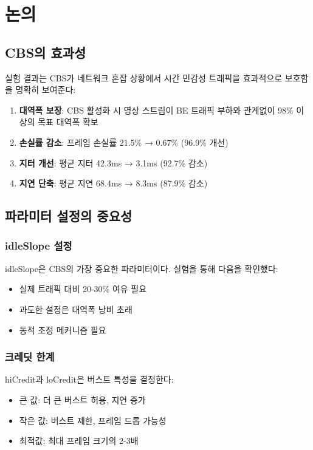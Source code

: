\documentclass[10pt,twocolumn]{IEEEtran}
\begin{document}
\section{논의}

\subsection{CBS의 효과성}

실험 결과는 CBS가 네트워크 혼잡 상황에서 시간 민감성 트래픽을 효과적으로 보호함을 명확히 보여준다:

\begin{enumerate}
\item \textbf{대역폭 보장}: CBS 활성화 시 영상 스트림이 BE 트래픽 부하와 관계없이 98\% 이상의 목표 대역폭 확보
\item \textbf{손실률 감소}: 프레임 손실률 21.5\% → 0.67\% (96.9\% 개선)
\item \textbf{지터 개선}: 평균 지터 42.3ms → 3.1ms (92.7\% 감소)
\item \textbf{지연 단축}: 평균 지연 68.4ms → 8.3ms (87.9\% 감소)
\end{enumerate}

\subsection{파라미터 설정의 중요성}

\subsubsection{idleSlope 설정}
idleSlope은 CBS의 가장 중요한 파라미터이다. 실험을 통해 다음을 확인했다:
\begin{itemize}
\item 실제 트래픽 대비 20-30\% 여유 필요
\item 과도한 설정은 대역폭 낭비 초래
\item 동적 조정 메커니즘 필요
\end{itemize}

\subsubsection{크레딧 한계}
hiCredit과 loCredit은 버스트 특성을 결정한다:
\begin{itemize}
\item 큰 값: 더 큰 버스트 허용, 지연 증가
\item 작은 값: 버스트 제한, 프레임 드롭 가능성
\item 최적값: 최대 프레임 크기의 2-3배
\end{itemize}
\end{document}
